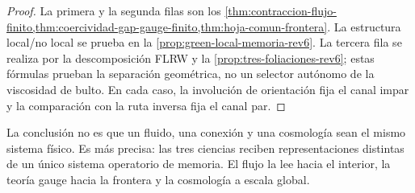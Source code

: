 \begin{proof}
La primera y la segunda filas son los
\cref{thm:contraccion-flujo-finito,thm:coercividad-gap-gauge-finito,thm:hoja-comun-frontera}.
La estructura local/no local se prueba en la
\cref{prop:green-local-memoria-rev6}.  La tercera fila se realiza por la
descomposición FLRW y la \cref{prop:tres-foliaciones-rev6}; estas fórmulas
prueban la separación geométrica, no un selector autónomo de la viscosidad
de bulto. En cada caso, la involución de orientación fija el canal impar y
la comparación con la ruta inversa fija el canal par.
\end{proof}

La conclusión no es que un fluido, una conexión y una cosmología sean el
mismo sistema físico.  Es más precisa: las tres ciencias reciben
representaciones distintas de un único sistema operatorio de memoria.  El flujo la
lee hacia el interior, la teoría gauge hacia la frontera y la cosmología a
escala global.
